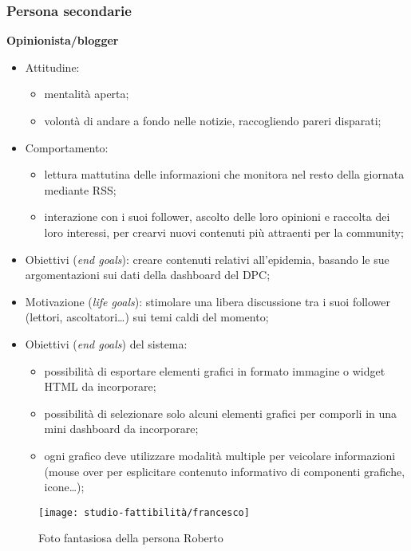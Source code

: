 \subsubsection*{Persona secondarie}
\textbf{Opinionista/blogger}
\begin{itemize}
    \item Attitudine:
    \begin{itemize}
        \item mentalità aperta;
        \item volontà di andare a fondo nelle notizie, raccogliendo pareri disparati;
    \end{itemize}
    \item Comportamento: 
    \begin{itemize}
        \item lettura mattutina delle informazioni che monitora nel resto della giornata mediante RSS;
        \item interazione con i suoi follower, ascolto delle loro opinioni e raccolta dei loro interessi, per crearvi nuovi contenuti più attraenti per la community;
    \end{itemize}
    \item Obiettivi (\textit{end goals}): creare contenuti relativi all'epidemia, basando le sue argomentazioni sui dati della dashboard del DPC;
    \item Motivazione (\textit{life goals}): stimolare una libera discussione tra i suoi follower (lettori, ascoltatori…) sui temi caldi del momento;
    \item Obiettivi (\textit{end goals}) del sistema:
    \begin{itemize}
        \item possibilità di esportare elementi grafici in formato immagine o widget HTML da incorporare;
        \item possibilità di selezionare solo alcuni elementi grafici per comporli in una mini dashboard da incorporare; 
        \item ogni grafico deve utilizzare modalità multiple per veicolare informazioni (mouse over per esplicitare contenuto informativo di componenti grafiche, icone…); 
    \end{itemize}
\end{itemize}

\begin{wrapfigure}{l}{7cm}
    \texttt{[image: studio-fattibilità/francesco]}
    \caption{Foto fantasiosa della persona Roberto}
\end{wrapfigure}

